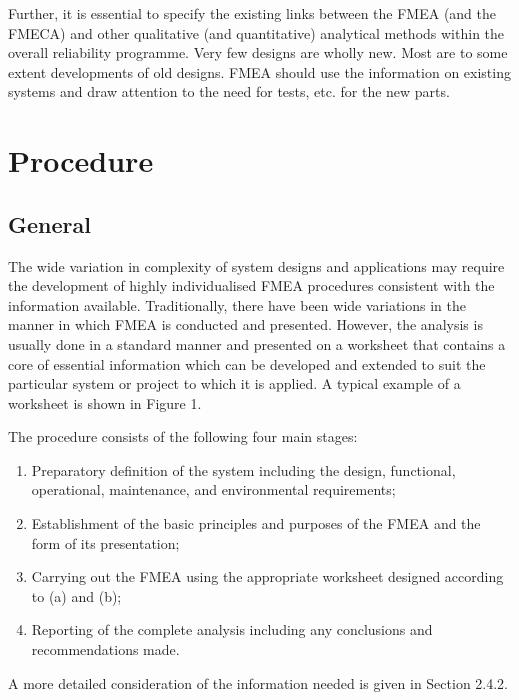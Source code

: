 \documentclass[./dissertation.tex]{subfiles}
\begin{document}
Further, it is essential to specify the existing links between the FMEA (and the FMECA) and other qualitative (and quantitative) analytical methods within the overall reliability programme.  Very few designs are wholly new. Most are to some extent developments of old designs. FMEA should use the information on existing systems and draw attention to the need for tests, etc. for the new parts.  



\section{Procedure}

\subsection{General}
The wide variation in complexity of system designs and applications may require the development of highly individualised FMEA procedures consistent with the information available. Traditionally, there have been wide variations in the manner in which FMEA is conducted and presented. However, the analysis is usually done in a standard manner and presented on a worksheet that contains a core of essential information which can be developed and extended to suit the particular system or project to which it is applied. A typical example of a worksheet is shown in Figure 1.

The procedure consists of the following four main stages:

\begin{enumerate}
\item Preparatory definition of the system including the design, functional, operational, maintenance, and environmental requirements;
\item Establishment of the basic principles and purposes of the FMEA and the form of its presentation;
\item Carrying out the FMEA using the appropriate worksheet designed according to (a) and (b);
\item Reporting of the complete analysis including any conclusions and recommendations made.
\end{enumerate}

A more detailed consideration of the information needed is given in Section 2.4.2.
\end{document}
